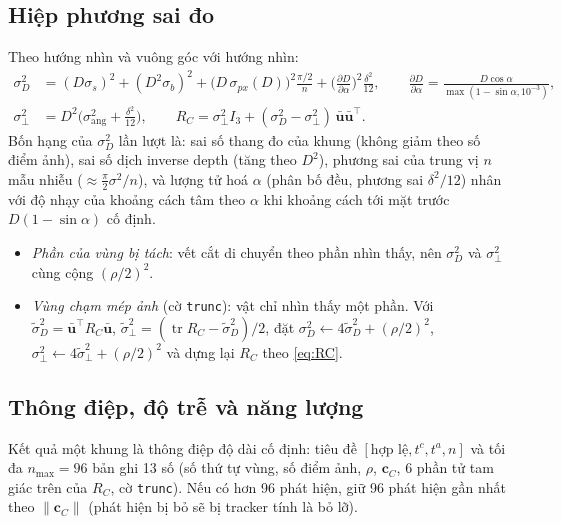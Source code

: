\documentclass[11pt,a4paper]{article}
\numberwithin{equation}{section}
\newcommand{\vb}[1]{\bm{#1}}
\newcommand{\T}{^{\!\top}}
\newcommand{\code}[1]{\texttt{\small #1}}
\theoremstyle{definition}
\theoremstyle{plain}
\theoremstyle{remark}
\begin{document}
\subsection{Hiệp phương sai đo}
\label{sec:RC}
Theo hướng nhìn và vuông góc với hướng nhìn:
\begin{align}
\sigma_D^2&=(D\sigma_s)^2+(D^2\sigma_b)^2+\big(D\,\sigma_{px}(D)\big)^2\frac{\pi/2}{n}+\Big(\frac{\partial D}{\partial\alpha}\Big)^2\frac{\delta^2}{12},\qquad
\frac{\partial D}{\partial\alpha}=\frac{D\cos\alpha}{\max(1-\sin\alpha,10^{-3})}, \label{eq:sigD}\\
\sigma_\perp^2&=D^2\Big(\sigma_{\text{ang}}^2+\frac{\delta^2}{12}\Big),\qquad
R_C=\sigma_\perp^2I_3+(\sigma_D^2-\sigma_\perp^2)\,\bar{\vb u}\bar{\vb u}\T. \label{eq:RC}
\end{align}
Bốn hạng của $\sigma_D^2$ lần lượt là: sai số thang đo của khung (không giảm theo số điểm ảnh), sai số dịch inverse depth (tăng theo $D^2$), phương sai của trung vị $n$ mẫu nhiễu ($\approx\frac\pi2\sigma^2/n$), và lượng tử hoá $\alpha$ (phân bố đều, phương sai $\delta^2/12$) nhân với độ nhạy của khoảng cách tâm theo $\alpha$ khi khoảng cách tới mặt trước $D(1-\sin\alpha)$ cố định.
\begin{itemize}
\item \emph{Phần của vùng bị tách}: vết cắt di chuyển theo phần nhìn thấy, nên $\sigma_D^2$ và $\sigma_\perp^2$ cùng cộng $(\rho/2)^2$.
\item \emph{Vùng chạm mép ảnh} (cờ \code{trunc}): vật chỉ nhìn thấy một phần. Với $\tilde\sigma_D^2=\bar{\vb u}\T R_C\bar{\vb u}$, $\tilde\sigma_\perp^2=(\operatorname{tr}R_C-\tilde\sigma_D^2)/2$, đặt $\sigma_D^2\leftarrow4\tilde\sigma_D^2+(\rho/2)^2$, $\sigma_\perp^2\leftarrow4\tilde\sigma_\perp^2+(\rho/2)^2$ và dựng lại $R_C$ theo \eqref{eq:RC}.
\end{itemize}

\subsection{Thông điệp, độ trễ và năng lượng}
\label{sec:delay}
Kết quả một khung là thông điệp độ dài cố định: tiêu đề $[\text{hợp lệ},t^c,t^a,n]$ và tối đa $n_{\max}=96$ bản ghi 13 số (số thứ tự vùng, số điểm ảnh, $\rho$, $\vb c_C$, 6 phần tử tam giác trên của $R_C$, cờ \code{trunc}). Nếu có hơn 96 phát hiện, giữ 96 phát hiện gần nhất theo $\|\vb c_C\|$ (phát hiện bị bỏ sẽ bị tracker tính là bỏ lỡ).
\end{document}
